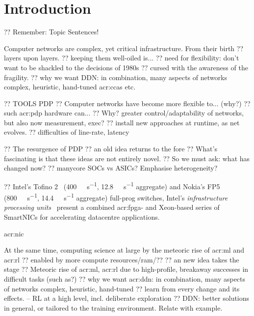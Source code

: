 \chapter{Introduction}\label{chap:intro}


?? Remember: Topic Sentences!

Computer networks are complex, yet critical infrastructure.
From their birth 
?? layers upon layers.
?? keeping them well-oiled is...
?? need for flexibility: don't want to be shackled to the decisions of 1980s
?? cursed with the awareness of the fragility.
?? why we want DDN: in combination, many aspects of networks complex, heuristic, hand-tuned \glspl{acr:cca} etc.

?? TOOLS PDP
?? Computer networks have become more flexible to... (why?)
?? such \gls{acr:pdp} hardware can...
?? Why? greater control/adaptability of networks, but also now measurement, exec?
?? install new approaches at runtime, as net evolves.
?? difficulties of line-rate, latency

?? The resurgence of PDP
?? an old idea returns to the fore
?? What's fascinating is that these ideas are not entirely novel.
?? So we must ask: what has changed now?
?? manycore SOCs vs ASICs? Emphasise heterogeneity?

?? Intel's Tofino 2~\parencite{tofino2} (\qty{400}{\giga\bit\per\second}, \qty{12.8}{\tera\bit\per\second} aggregate) and Nokia's FP5~\parencite{nokia-fp5} (\qty{800}{\giga\bit\per\second}, \qty{14.4}{\tera\bit\per\second} aggregate) full-prog switches, Intel's \emph{infrastructure processing units}~\parencite{intel-ipu} present a combined \gls{acr:fpga}- and Xeon-based series of SmartNICs for accelerating datacentre applications.

\gls{acr:nic}

At the same time, computing science at large by the meteoric rise of \gls{acr:ml} and \gls{acr:rl} ?? enabled by more compute resources/ram/??
?? an new idea takes the stage
?? Meteoric rise of \gls{acr:ml}, \gls{acr:rl} due to high-profile, breakaway successes in difficult tasks (such as?)
?? why we want \gls{acr:ddn}: in combination, many aspects of networks complex, heuristic, hand-tuned
?? learn from every change and its effects. -- RL at a high level, incl. deliberate exploration
?? DDN: better solutions in general, or tailored to the training environment. Relate with example.

